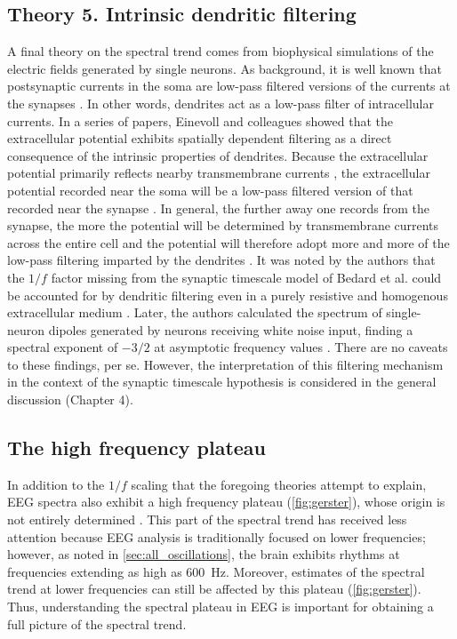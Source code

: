 \subsection{Theory 5. Intrinsic dendritic filtering}
A final theory on the spectral trend comes from biophysical simulations of the electric fields generated by single neurons. As background, it is well known that postsynaptic currents in the soma are low-pass filtered versions of the currents at the synapses \cite{Rall1967}. In other words, dendrites act as a low-pass filter of intracellular currents. In a series of papers, Einevoll and colleagues showed that the extracellular potential exhibits spatially dependent filtering as a direct consequence of the intrinsic properties of dendrites. Because the extracellular potential primarily reflects nearby transmembrane currents \cite{Nunez2006}, the extracellular potential recorded near the soma will be a low-pass filtered version of that recorded near the synapse \cite{Linden2010}. In general, the further away one records from the synapse, the more the potential will be determined by transmembrane currents across the entire cell and the potential will therefore adopt more and more of the low-pass filtering imparted by the dendrites \cite{Linden2010}. It was noted by the authors that the $1/f$ factor missing from the synaptic timescale model of Bedard et al. \cite{Bedard2006} could be accounted for by dendritic filtering even in a purely resistive and homogenous extracellular medium \cite{Linden2010,Pettersen2008}. Later, the authors calculated the spectrum of single-neuron dipoles generated by neurons receiving white noise input, finding a spectral exponent of $-3/2$ at asymptotic frequency values \cite{Pettersen2014}. There are no caveats to these findings, per se. However, the interpretation of this filtering mechanism in the context of the synaptic timescale hypothesis is considered in the general discussion (Chapter 4). 

\subsection{The high frequency plateau}
In addition to the $1/f$ scaling that the foregoing theories attempt to explain, EEG spectra also exhibit a high frequency plateau (\autoref{fig:gerster}), whose origin is not entirely determined \cite{Gerster2022}. This part of the spectral trend has received less attention because EEG analysis is traditionally focused on lower frequencies; however, as noted in \autoref{sec:all_oscillations}, the brain exhibits rhythms at frequencies extending as high as \qty{600}{\hertz}. Moreover, estimates of the spectral trend at lower frequencies can still be affected by this plateau (\autoref{fig:gerster}). Thus, understanding the spectral plateau in EEG is important for obtaining a full picture of the spectral trend. 

